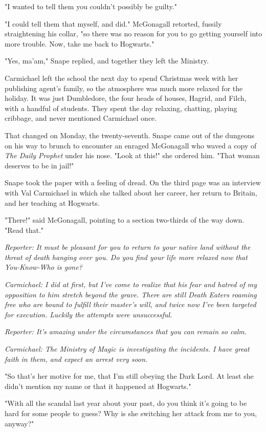 "I wanted to tell them you couldn't possibly be guilty."

"I could tell them that myself, and did." McGonagall retorted, fussily straightening his collar, "so there was no reason for you to go getting yourself into more trouble. Now, take me back to Hogwarts."

"Yes, ma'am," Snape replied, and together they left the Ministry.

Carmichael left the school the next day to spend Christmas week with her publishing agent's family, so the atmosphere was much more relaxed for the holiday. It was just Dumbledore, the four heads of houses, Hagrid, and Filch, with a handful of students. They spent the day relaxing, chatting, playing cribbage, and never mentioned Carmichael once.

That changed on Monday, the twenty-seventh. Snape came out of the dungeons on his way to brunch to encounter an enraged McGonagall who waved a copy of \emph{The Daily Prophet} under his nose. "Look at this!" she ordered him. "That woman deserves to be in jail!"

Snape took the paper with a feeling of dread. On the third page was an interview with Val Carmichael in which she talked about her career, her return to Britain, and her teaching at Hogwarts.

"There!" said McGonagall, pointing to a section two-thirds of the way down. "Read that."

\emph{Reporter: It must be pleasant for you to return to your native land without the threat of death hanging over you. Do you find your life more relaxed now that You-Know-Who is gone?}

\emph{Carmichael: I did at first, but I've come to realize that his fear and hatred of my opposition to him stretch beyond the grave. There are still Death Eaters roaming free who are bound to fulfill their master's will, and twice now I've been targeted for execution. Luckily the attempts were unsuccessful.}

\emph{Reporter: It's amazing under the circumstances that you can remain so calm.}

\emph{Carmichael: The Ministry of Magic is investigating the incidents. I have great faith in them, and expect an arrest very soon.}

"So that's her motive for me, that I'm still obeying the Dark Lord. At least she didn't mention my name or that it happened at Hogwarts."

"With all the scandal last year about your past, do you think it's going to be hard for some people to guess? Why is she switching her attack from me to you, anyway?"

